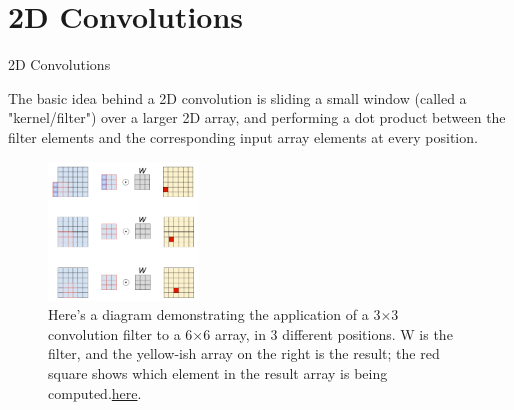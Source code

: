 \section{2D Convolutions}

\begin{vbframe}{2D Convolutions}

The basic idea behind a 2D convolution is sliding a small window (called a "kernel/filter") over a larger 2D array, and performing a dot product between the filter elements and the corresponding input array elements at every position.
    \begin{figure}
        \centering
        \includegraphics[width=4cm]{plots/05_conv_variations/2d/2dconv.png}
        \caption{\tiny Here's a diagram demonstrating the application of a 3$\times$3 convolution filter to a 6$\times$6 array, in 3 different positions. W is the filter, and the yellow-ish array on the right is the result; the red square shows which element in the result array is being computed.\href{https://eli.thegreenplace.net/2018/depthwise-separable-convolutions-for-machine-learning/}{here}.}
    \end{figure}
\end{vbframe}

